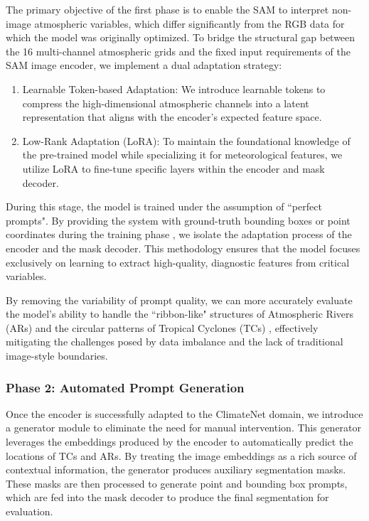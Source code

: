 The primary objective of the first phase is to enable the SAM  to interpret non-image atmospheric variables, which differ significantly from the RGB data for which the model was originally optimized. To bridge the structural gap between the 16 multi-channel atmospheric grids  and the fixed input requirements of the SAM image encoder, we implement a dual adaptation strategy:

\begin{enumerate}
\item Learnable Token-based Adaptation: We introduce learnable tokens to compress the high-dimensional atmospheric channels into a latent representation that aligns with the encoder's expected feature space.
\item Low-Rank Adaptation (LoRA): To maintain the foundational knowledge of the pre-trained model while specializing it for meteorological features, we utilize LoRA to fine-tune specific layers within the encoder and mask decoder.
\end{enumerate}


During this stage, the model is trained under the assumption of ``perfect prompts". By providing the system with ground-truth bounding boxes or point coordinates during the training phase , we isolate the adaptation process of the encoder and the mask decoder. This methodology ensures that the model focuses exclusively on learning to extract high-quality, diagnostic features from critical variables.

By removing the variability of prompt quality, we can more accurately evaluate the model's ability to handle the ``ribbon-like" structures of Atmospheric Rivers (ARs) and the circular patterns of Tropical Cyclones (TCs) , effectively mitigating the challenges posed by data imbalance and the lack of traditional image-style boundaries.

\subsubsection{Phase 2: Automated Prompt Generation}
Once the encoder is successfully adapted to the ClimateNet domain, we introduce a generator module to eliminate the need for manual intervention. This generator leverages the embeddings produced by the encoder to automatically predict the locations of TCs and ARs. By treating the image embeddings as a rich source of contextual information, the generator produces auxiliary segmentation masks. These masks are then processed to generate point and bounding box prompts, which are fed into the mask decoder to produce the final segmentation for evaluation.
